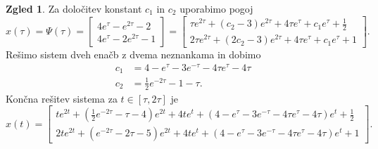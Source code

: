 \documentclass[12pt,a4paper]{amsart}
\theoremstyle{definition} %
\newtheorem{zgled}[definicija]{Zgled}
\theoremstyle{plain} %
\begin{document}
\begin{zgled}
    Za določitev konstant $c_1$ in $c_2$ uporabimo pogoj
    \[x(\tau) =\Psi(\tau)=\begin{bmatrix}
        4e^{\tau}-e^{2\tau}-2  \\
        4e^{\tau}-2e^{2\tau}-1  
    \end{bmatrix} = \begin{bmatrix}
        \tau e^{2\tau}+(c_2-3)e^{2\tau}+4\tau e^\tau+c_1e^\tau+\frac{1}{2}  \\
        2\tau e^{2\tau}+(2c_2-3)e^{2\tau}+4\tau e^{\tau}+c_1e^\tau+1 
    \end{bmatrix}. \]
    Rešimo sistem dveh enačb z dvema neznankama in dobimo 
    \begin{equation*}
        \begin{split}
            c_1 &= 4-e^{\tau}-3e^{-\tau}-4\tau e^{\tau}-4\tau \\
            c_2 &= \frac{1}{2}e^{-2\tau}-1-\tau.
        \end{split}
    \end{equation*}
    Končna rešitev sistema za $t\in[\tau,2\tau]$ je
    \[x(t)= \begin{bmatrix}
        te^{2t}+(\frac{1}{2}e^{-2\tau}-\tau-4)e^{2t}+4te^t+(4-e^{\tau}-3e^{-\tau}-4\tau e^{\tau}-4\tau)e^t+\frac{1}{2}  \\
        2te^{2t}+(e^{-2\tau}-2\tau-5)e^{2t}+4te^{t}+(4-e^{\tau}-3e^{-\tau}-4\tau e^{\tau}-4\tau)e^t+1 
    \end{bmatrix}.\]

\end{zgled}
\end{document}
